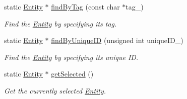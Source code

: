 \begin{DoxyCompactItemize}
static \hyperlink{class_magnum_1_1_entity}{Entity} $\ast$ \hyperlink{class_magnum_1_1_entity_ac39f9be772d7d8bb3ca77a441e05d5d2}{find\+By\+Tag} (const char $\ast$tag\+\_\+)
\begin{DoxyCompactList}\small\item\em Find the \hyperlink{class_magnum_1_1_entity}{Entity} by specifying its tag. \end{DoxyCompactList}\item 
static \hyperlink{class_magnum_1_1_entity}{Entity} $\ast$ \hyperlink{class_magnum_1_1_entity_a3e59b521e341639b1242f39583b77ff2}{find\+By\+Unique\+ID} (unsigned int unique\+I\+D\+\_\+)
\begin{DoxyCompactList}\small\item\em Find the \hyperlink{class_magnum_1_1_entity}{Entity} by specifying its unique ID. \end{DoxyCompactList}\item 
static \hyperlink{class_magnum_1_1_entity}{Entity} $\ast$ \hyperlink{class_magnum_1_1_entity_a6f25a85b01d260b79b2d9f4950bf8cc0}{get\+Selected} ()
\begin{DoxyCompactList}\small\item\em Get the currently selected \hyperlink{class_magnum_1_1_entity}{Entity}. \end{DoxyCompactList}\end{DoxyCompactItemize}
